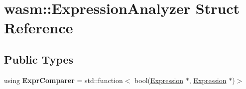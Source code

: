 \hypertarget{structwasm_1_1_expression_analyzer}{}\section{wasm\+:\+:Expression\+Analyzer Struct Reference}
\label{structwasm_1_1_expression_analyzer}
\subsection*{Public Types}
\begin{DoxyCompactItemize}
\item 
\mbox{\label{structwasm_1_1_expression_analyzer_af0bd1b0aadf9489399be77c507bb9e98}} 
using {\bfseries Expr\+Comparer} = std\+::function$<$ bool(\mbox{\hyperlink{classwasm_1_1_expression}{Expression}} $\ast$, \mbox{\hyperlink{classwasm_1_1_expression}{Expression}} $\ast$)$>$
\end{DoxyCompactItemize}

